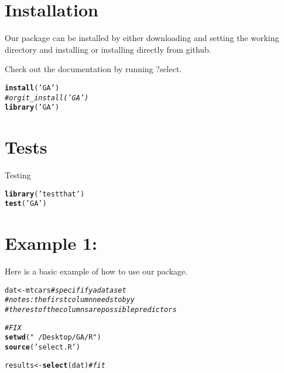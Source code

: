 \documentclass{article}\usepackage[]{graphicx}\usepackage[]{color}
\makeatletter
\newcommand{\hlstr}[1]{\textcolor[rgb]{0.192,0.494,0.8}{#1}}%
\newcommand{\hlcom}[1]{\textcolor[rgb]{0.678,0.584,0.686}{\textit{#1}}}%
\newcommand{\hlstd}[1]{\textcolor[rgb]{0.345,0.345,0.345}{#1}}%
\newcommand{\hlkwb}[1]{\textcolor[rgb]{0.69,0.353,0.396}{#1}}%
\newcommand{\hlkwd}[1]{\textcolor[rgb]{0.737,0.353,0.396}{\textbf{#1}}}%
\newenvironment{kframe}{%
 \def\at@end@of@kframe{}%
 \ifinner\ifhmode%
  \def\at@end@of@kframe{\end{minipage}}%
  \begin{minipage}{\columnwidth}%
 \fi\fi%
 \def\FrameCommand##1{\hskip\@totalleftmargin \hskip-\fboxsep
 \colorbox{shadecolor}{##1}\hskip-\fboxsep
     \hskip-\linewidth \hskip-\@totalleftmargin \hskip\columnwidth}%
 \MakeFramed {\advance\hsize-\width
   \@totalleftmargin\z@ \linewidth\hsize
   \@setminipage}}%
 {\par\unskip\endMakeFramed%
 \at@end@of@kframe}
\newenvironment{knitrout}{}{} %
\makeatother
\begin{document}
\section*{Installation}

Our package can be installed by either downloading and setting the working directory and installing or installing directly from github.

Check out the documentation by running ?select.
\begin{knitrout}
\color{fgcolor}\begin{kframe}
\begin{alltt}
\hlkwd{install}\hlstd{(}\hlstr{'GA'}\hlstd{)}
\hlcom{# or git_install('GA')}
\hlkwd{library}\hlstd{(}\hlstr{'GA'}\hlstd{)}
\end{alltt}
\end{kframe}
\end{knitrout}

\section*{Tests}

Testing
\begin{knitrout}
\color{fgcolor}\begin{kframe}
\begin{alltt}
\hlkwd{library}\hlstd{(}\hlstr{'testthat'}\hlstd{)}
\hlkwd{test}\hlstd{(}\hlstr{'GA'}\hlstd{)}
\end{alltt}
\end{kframe}
\end{knitrout}

\section*{Example 1:}

Here is a basic example of how to use our package.

\begin{knitrout}
\color{fgcolor}\begin{kframe}
\begin{alltt}
\hlstd{dat}\hlkwb{<-}\hlstd{mtcars} \hlcom{# specifify a data set}
\hlcom{# notes: the first column needs to by y}
\hlcom{# the rest of the columns are possible predictors}

\hlcom{# FIX}
\hlkwd{setwd}\hlstd{(}\hlstr{"~/Desktop/GA/R"}\hlstd{)}
\hlkwd{source}\hlstd{(}\hlstr{'select.R'}\hlstd{)}

\hlstd{results}\hlkwb{<-}\hlkwd{select}\hlstd{(dat)} \hlcom{# fit}
\end{alltt}


{\ttfamily\noindent\bfseries{}}\end{kframe}
\end{knitrout}
\end{document}
